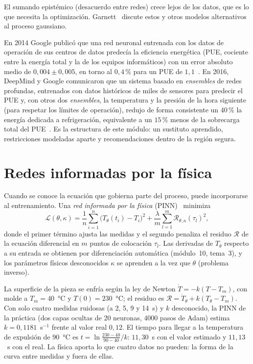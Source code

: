 El sumando epistémico (desacuerdo entre redes) crece lejos de los datos, que es lo que necesita la optimización. Garnett~\cite[§8.11]{garnett} discute estos y otros modelos alternativos al proceso gaussiano.

\begin{ejemplo}\label{ej:google}
En 2014 Google publicó que una red neuronal entrenada con los datos de operación de sus centros de datos predecía la eficiencia energética (PUE, cociente entre la energía total y la de los equipos informáticos) con un error absoluto medio de $0{,}004\pm0{,}005$, en torno al $0{,}4\,\%$ para un PUE de $1{,}1$~\cite{gao2014}. En 2016, DeepMind y Google comunicaron que un sistema basado en \emph{ensembles} de redes profundas, entrenados con datos históricos de miles de sensores para predecir el PUE y, con otros dos \emph{ensembles}, la temperatura y la presión de la hora siguiente (para respetar los límites de operación), redujo de forma consistente un $40\,\%$ la energía dedicada a refrigeración, equivalente a un $15\,\%$ menos de la sobrecarga total del PUE~\cite{deepmind2016}. Es la estructura de este módulo: un sustituto aprendido, restricciones modeladas aparte y recomendaciones dentro de la región segura.
\end{ejemplo}

\section{Redes informadas por la física}

Cuando se conoce la ecuación que gobierna parte del proceso, puede incorporarse al entrenamiento. Una \emph{red informada por la física} (PINN)~\cite{raissi} minimiza
\[
\mathcal L(\theta,\kappa)=\frac1{n}\sum_{i=1}^{n}\bigl(T_\theta(t_i)-T_i\bigr)^2+\frac{\lambda}{m}\sum_{l=1}^{m}\mathcal R_{\theta,\kappa}(\tau_l)^2,
\]
donde el primer término ajusta las medidas y el segundo penaliza el residuo $\mathcal R$ de la ecuación diferencial en $m$ puntos de colocación $\tau_l$. Las derivadas de $T_\theta$ respecto a su entrada se obtienen por diferenciación automática (módulo~10, tema~3), y los parámetros físicos desconocidos $\kappa$ se aprenden a la vez que $\theta$ (problema inverso).

\begin{ejemplo}\label{ej:pinn}
La superficie de la pieza se enfría según la ley de Newton $\dot T=-k(T-T_m)$, con molde a $T_m=40$~°C y $T(0)=230$~°C; el residuo es $\mathcal R=\dot T_\theta+k(T_\theta-T_m)$. Con solo cuatro medidas ruidosas (a 2, 5, 9 y 14~s) y $k$ desconocido, la PINN de la práctica (dos capas ocultas de 20 neuronas, 4000 pasos de Adam) estima $k=0{,}1181$~s$^{-1}$ frente al valor real $0{,}12$. El tiempo para llegar a la temperatura de expulsión de 90~°C es $t=\ln\frac{230-40}{90-40}/k$: $11{,}30$~s con el valor estimado y $11{,}13$~s con el real. La física aporta lo que cuatro datos no pueden: la forma de la curva entre medidas y fuera de ellas.
\end{ejemplo}

